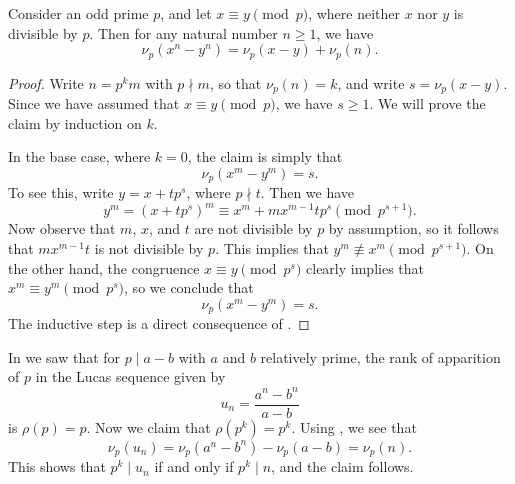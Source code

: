 \begin{theorem}\label{theorem:lte}
  Consider an odd prime $p$, and let $x\equiv y\pmod{p}$, where neither $x$ nor $y$ is divisible by $p$. Then for any natural number $n\geq 1$, we have
  \begin{equation*}
    \nu_p(x^n-y^n)=\nu_p(x-y)+\nu_p(n).
  \end{equation*}
\end{theorem}

\begin{proof}
  Write $n=p^km$ with $p\nmid m$, so that $\nu_p(n)=k$, and write $s=\nu_p(x-y)$. Since we have assumed that $x\equiv y\pmod{p}$, we have $s\geq 1$. We will prove the claim by induction on $k$.

  In the base case, where $k=0$, the claim is simply that
  \begin{equation*}
    \nu_p(x^m-y^m)=s.
  \end{equation*}
  To see this, write $y=x+tp^s$, where $p\nmid t$. Then we have
  \begin{equation*}
    y^m=(x+tp^s)^m\equiv x^m+mx^{m-1}tp^s \pmod{p^{s+1}}.
  \end{equation*}
  Now observe that $m$, $x$, and $t$ are not divisible by $p$ by assumption, so it follows that $mx^{m-1}t$ is not divisible by $p$. This implies that $y^m\nequiv x^m\pmod{p^{s+1}}$. On the other hand, the congruence $x\equiv y\pmod{p^s}$ clearly implies that $x^m\equiv y^m\pmod{p^s}$, so we conclude that
  \begin{equation*}
    \nu_p(x^m-y^m)=s.
  \end{equation*}
  The inductive step is a direct consequence of .
\end{proof}

\begin{example}
  In  we saw that for $p\mid a-b$ with $a$ and $b$ relatively prime, the rank of apparition of $p$ in the Lucas sequence given by
  \begin{equation*}
    u_n=\frac{a^n-b^n}{a-b}
  \end{equation*}
  is $\rho(p)=p$. Now we claim that $\rho(p^k)=p^k$. Using , we see that
  \begin{equation*}
    \nu_p(u_n)=\nu_p(a^n-b^n)-\nu_p(a-b)=\nu_p(n). 
  \end{equation*}
  This shows that $p^k\mid u_n$ if and only if $p^k\mid n$, and the claim follows.
\end{example}

